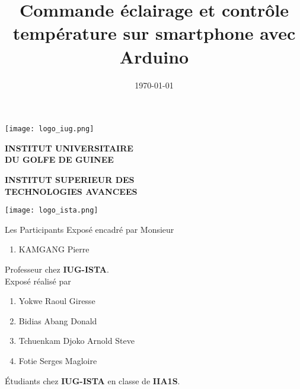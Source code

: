 \documentclass{beamer}
\title{Commande éclairage et contrôle température sur smartphone avec Arduino}
\date{\today}
\begin{document}
	\begin{frame}	
		\begin{center}
			\begin{minipage}[h]{0.2\textwidth}
				\texttt{[image: logo\_iug.png]}
			\end{minipage}
			\begin{minipage}[h]{0.45\textwidth}
				\centering
				\textbf{INSTITUT UNIVERSITAIRE \\DU GOLFE DE GUINEE} \\
				\begin{minipage}[t]{1\textwidth}
					\centering
					\footnotesize \textbf{INSTITUT SUPERIEUR DES \\TECHNOLOGIES AVANCEES}
				\end{minipage}
			\end{minipage}
			\begin{minipage}[h]{0.1\textwidth}
				\texttt{[image: logo\_ista.png]}
			\end{minipage}
		\end{center}
		\begin{titlepage}
		\end{titlepage}
	\end{frame}
	
	\begin{frame}{Les Participants}
		Exposé encadré par Monsieur
		\begin{enumerate}
			\item KAMGANG Pierre
		\end{enumerate}
		\vspace{4pt}
		 Professeur chez \textbf{IUG-ISTA}.\\
		\vspace{20pt}
		Exposé réalisé par
		\begin{enumerate}
			\item Yokwe Raoul Giresse
			\item Bidias Abang Donald
			\item Tchuenkam Djoko Arnold Steve
			\item Fotie Serges Magloire
		\end{enumerate}
		\vspace{4pt}
		Étudiants chez \textbf{IUG-ISTA} en classe de \textbf{IIA1S}.
	\end{frame}
	
\end{document}
